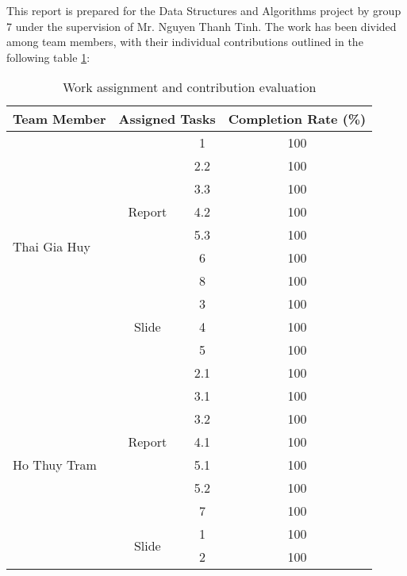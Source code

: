 This report is prepared for the Data Structures and Algorithms project by group 7 under the supervision of Mr. Nguyen Thanh Tinh. The work has been divided among team members, with their individual contributions outlined in the following table \ref{tab:work_assignment}:
\begin{table}[h!]
    \caption{Work assignment and contribution evaluation}
    \centering
    \begin{tabular}{|l|c|c|c|}
    \hline
    \textbf{Team Member} & \multicolumn{2}{|c|}{\textbf{Assigned Tasks}} & \textbf{Completion Rate (\%)}  \\ \hline
    \multirow{10}{*}{Thai Gia Huy} & \multirow{7}{*}{Report} & 1   & 100 \\ \cline{3-4}
                                  &                         & 2.2 & 100 \\ \cline{3-4}
                                  &                         & 3.3 & 100 \\ \cline{3-4}
                                  &                         & 4.2 & 100 \\ \cline{3-4}
                                  &                         & 5.3 & 100 \\ \cline{3-4}
                                  &                         & 6   & 100 \\ \cline{3-4}
                                  &                         & 8   & 100 \\ \cline{2-4}
                                  & \multirow{3}{*}{Slide}  & 3   & 100 \\ \cline{3-4}
                                  &                         & 4   & 100 \\ \cline{3-4}
                                  &                         & 5   & 100 \\ \cline{1-4}
    \multirow{9}{*}{Ho Thuy Tram} & \multirow{7}{*}{Report} & 2.1 & 100 \\ \cline{3-4}
                                  &                         & 3.1 & 100 \\ \cline{3-4}
                                  &                         & 3.2 & 100 \\ \cline{3-4}
                                  &                         & 4.1 & 100 \\ \cline{3-4}
                                  &                         & 5.1 & 100 \\ \cline{3-4}
                                  &                         & 5.2 & 100 \\ \cline{3-4}
                                  &                         & 7   & 100 \\ \cline{2-4}
                                  & \multirow{2}{*}{Slide}  & 1   & 100 \\ \cline{3-4}
                                  &                         & 2   & 100 \\ \cline{1-4}
    \end{tabular}
    
    \label{tab:work_assignment}
\end{table}

